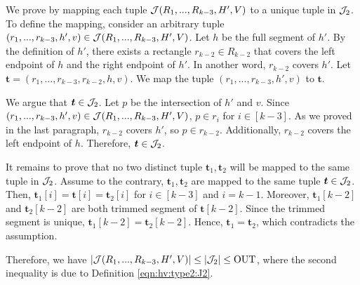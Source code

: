 We prove by mapping each tuple $\mathcal{J}(R_1,...,R_{k-3},H',V)$ to a unique tuple in $\mathcal{J}_2$. 
To define the mapping, consider an arbitrary tuple $(r_1,...,r_{k-3}, h', v) \in \mathcal{J}(R_1,...,R_{k-3},H',V)$. Let $h$ be the full segment of $h'$. By the definition of $h'$, there exists a rectangle $r_{k-2}\in R_{k-2}$ that covers the left endpoint of $h$ and the right endpoint of $h'$. In another word, $r_{k-2}$ covers $h'$. Let $\bm{t} = (r_1,...,r_{k-3}, r_{k-2},h,v)$. We map the tuple $(r_1,...,r_{k-3}, h', v)$ to $\bm{t}$. 

\vgap 

We argue that $\textrm{\boldmath${t}$}\in \mathcal{J}_2$. Let $p$ be the intersection of $h'$ and $v$. Since $(r_1,...,r_{k-3}, h', v) \in \mathcal{J}(R_1,...,R_{k-3},H',V)$, $p \in r_i$ for $i \in [k-3]$. As we proved in the last paragraph, $r_{k-2}$ covers $h'$, so $p \in r_{k-2}$. Additionally, $r_{k-2}$ covers the left endpoint of $h$. Therefore, $\textrm{\boldmath${t}$} \in \mathcal{J}_2$.

\vgap

It remains to prove that no two distinct tuple $\bm{t}_1, \bm{t}_2$ will be mapped to the same tuple in $\mathcal{J}_2$. Assume to the contrary, $\bm{t}_1, \bm{t}_2$ are mapped to the same tuple $\textrm{\boldmath${t}$} \in \mathcal{J}_2$. Then, $\bm{t}_1[i] = \bm{t}[i] = \bm{t}_2[i]$ for $i\in [k-3]$ and $i = k-1$. Moreover, $\bm{t}_1[k-2]$ and $\bm{t}_2[k-2]$ are both trimmed segment of $\bm{t}[k-2]$. Since the trimmed segment is unique, $\bm{t}_1[k-2] = \bm{t}_2[k-2]$. Hence, $\bm{t}_1 = \bm{t}_2$, which contradicts the assumption.  

\vgap

Therefore, we have $|\mathcal{J}(R_1,...,R_{k-3},H',V)| \le |\mathcal{J}_2| \le \mathrm{OUT}$, where the second inequality is due to Definition \eqref{eqn:hv:type2:J2}. 
